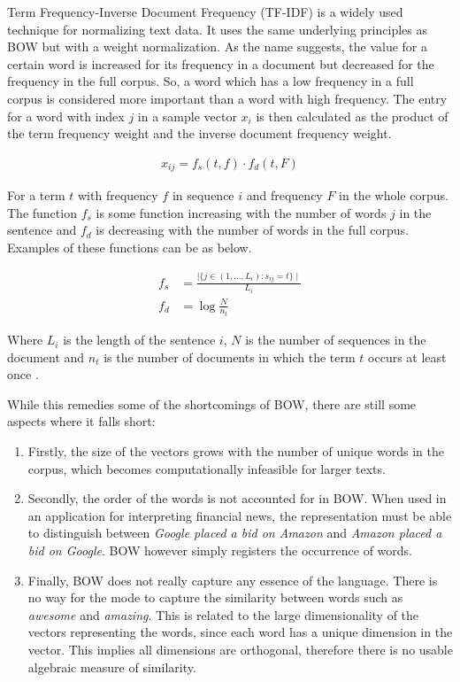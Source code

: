 Term Frequency-Inverse Document Frequency (TF-IDF) is a widely used technique for normalizing text data. It uses the same underlying principles as BOW but with a weight normalization. As the name suggests, the value for a certain word is increased for its frequency in a document but decreased for the frequency in the full corpus. So, a word which has a low frequency in a full corpus is considered more important than a word with high frequency. The entry for a word with index $j$ in a sample vector $x_i$ is then calculated as the product of the term frequency weight and the inverse document frequency weight. 

\begin{align*}
    x_{ij} = f_s(t,f) \cdot f_d(t,F)
\end{align*}

For a term $t$ with frequency $f$ in sequence $i$ and frequency $F$ in the whole corpus. The function $f_s$ is some function increasing with the number of words $j$ in the sentence and $f_d$ is decreasing with the number of words in the full corpus. Examples of these functions can be as below. 

\begin{align*}
    f_s &= \frac{\mid \{ j \in (1, \hdots , L_i) : s_{ij} = t  \} \mid}{L_i} \\
    f_d &= \log{\frac{N}{n_t}}
\end{align*}

Where $L_i$ is the length of the sentence $i$, $N$ is the number of sequences in the document and $n_t$ is the number of documents in which the term $t$ occurs at least once \citep{manning2008introduction}. 

While this remedies some of the shortcomings of BOW, there are still some aspects where it falls short: 
\begin{enumerate}
    \item Firstly, the size of the vectors grows with the number of unique words in the corpus, which becomes computationally infeasible for larger texts. 
    \item Secondly, the order of the words is not accounted for in BOW. When used in an application for interpreting financial news, the representation must be able to distinguish between \textit{Google placed a bid on Amazon} and \textit{Amazon placed a bid on Google}. BOW however simply registers the occurrence of words. 
    \item Finally, BOW does not really capture any essence of the language. There is no way for the mode to capture the similarity between words such as \textit{awesome} and \textit{amazing}. This is related to the large dimensionality of the vectors representing the words, since each word has a unique dimension in the vector. This implies all dimensions are orthogonal, therefore there is no usable algebraic measure of similarity. 
\end{enumerate}

